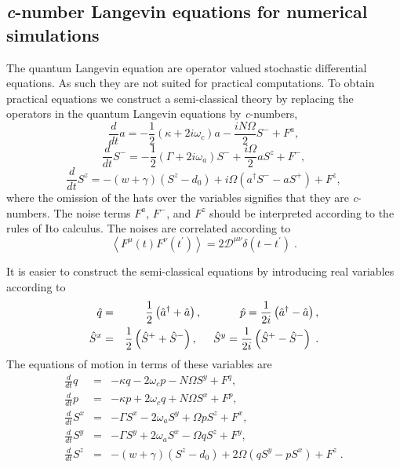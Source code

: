 \documentclass[aps,
twocolumn,
showpacs,
superscriptaddress,groupedaddress]{revtex4}
\begin{document}
\subsection{{\it c}-number Langevin equations for numerical simulations}

The quantum Langevin equation are operator valued stochastic
differential equations.  As such they are not suited for practical
computations.  To obtain practical equations we construct a
semi-classical theory by replacing the operators in the quantum Langevin
equations by {\it c}-numbers,
\begin{equation}
\frac{d}{dt} a= -\frac{1}{2}  (\kappa +2i\omega_c) a
-\frac{i N \Omega}{2} S^{-}
+F^{a},
\label{Lac}
\end{equation}
\begin{equation}
\frac{d}{dt} S^{-} = -\frac{1}{2}  \left(\Gamma +2 i \omega_a \right)  S^{-}
+\frac{i \Omega}{2} a S^{z}
+F^{-},
\end{equation}
\begin{equation}
\frac{d}{dt} S^{z} = -(w+\gamma)\left( S^{z} - d_0\right)
+i\Omega \left( a^{\dagger}S^{-} - a S^{+} \right)
\label{Lszc}
+F^{z},
\end{equation}
where the omission of the hats over the variables signifies that they
are {\it c}-numbers.  The noise terms $F^a$, $F^-$, and $F^z$ should be
interpreted according to the rules of Ito calculus.  The noises are
correlated according to
\begin{equation}
\left< F^{\mu}(t) F^{\nu}(t^{\prime})\right> =
2 \mathscr{D}^{\mu \nu} \delta(t-t^{\prime})\;.
\label{ClassicalDiffusion1}
\end{equation}

It is easier to construct the semi-classical equations by introducing
real variables according to
\begin{eqnarray}
\hspace{-0.5in} \hat{q} &=&
\frac{1}{2} \left( \hat{a}^{\dagger} + \hat{a} \right),
\hspace{0.48in} \hat{p} =
\frac{1}{2i} \left( \hat{a}^{\dagger} - \hat{a} \right),
\\
\hat{S}^x &=&
\frac{1}{2} \left( \hat{S}^{+} + \hat{S}^{-} \right),
\hspace{0.2in} \hat{S}^y =
\frac{1}{2i} \left( \hat{S}^{+} - \hat{S}^{-} \right)\;.
\end{eqnarray}
The equations of motion in terms of these variables are
\begin{eqnarray}
\frac{d}{dt} q &=& -\kappa q - 2 \omega_c p - N \Omega S^{y} + F^{q},
\label{cq1}
\\
\frac{d}{dt} p&=& -\kappa p + 2 \omega_c q + N \Omega S^{x} + F^{p},
\\
\frac{d}{dt} S^{x} &=&
-\Gamma S^{x}  - 2 \omega_a S^{y} + \Omega p S^{z} + F^{x},
\\
\frac{d}{dt} S^{y} &=&
-\Gamma S^{y}  + 2 \omega_a S^{x} - \Omega q S^{z} + F^{y},
\\
\frac{d}{dt} S^{z} &=& -(w+\gamma)\left( S^{z} - d_0\right)
+2 \Omega \left( q S^{y} - p S^{x} \right)
+F^{z}\;.
\nonumber
\\
\label{eqn:cnumberlangevin}
\end{eqnarray}
\end{document}
